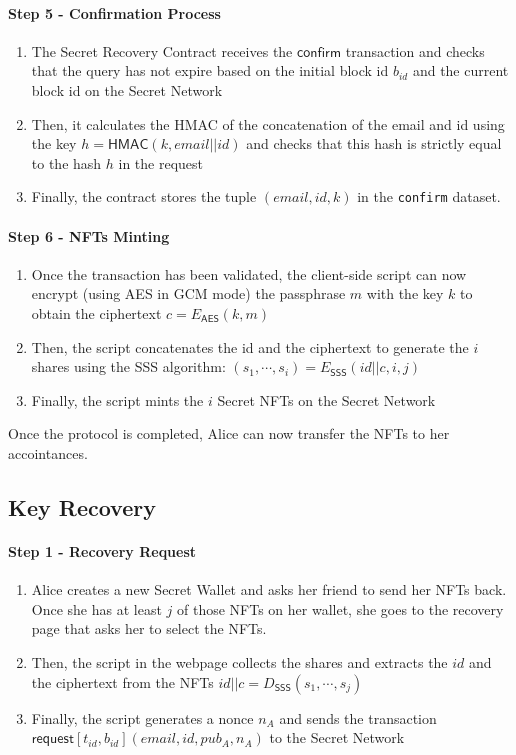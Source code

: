 \documentclass[12pt]{article}
\newcommand{\ms}[1]{\ensuremath{\mathsf{#1}}}
\newcommand{\tx}[3]{\ms{#1}[#2](#3)}
\begin{document}
\paragraph{Step 5 - Confirmation Process}

\begin{enumerate}[label=5.\arabic*]
  \item The Secret Recovery Contract receives the $\ms{confirm}$ transaction and checks that the query has not expire based on the initial block id $b_{id}$ and the current block id on the Secret Network
  \item Then, it calculates the HMAC of the concatenation of the email and id using the key $h=\ms{HMAC}(k, email || id)$ and checks that this hash is strictly equal to the hash $h$ in the request
  \item Finally, the contract stores the tuple $(email, id, k)$ in the {\tt confirm} dataset.
\end{enumerate}

\paragraph{Step 6 - NFTs Minting}

\begin{enumerate}[label=6.\arabic*]
  \item Once the transaction has been validated, the client-side script can now encrypt (using AES in GCM mode) the passphrase $m$ with the key $k$ to obtain the ciphertext $c=E_{\ms{AES}}(k, m)$
  \item Then, the script concatenates the id and the ciphertext to generate the $i$ shares using the SSS algorithm: $(s_1,\cdots,s_i)=E_{\ms{SSS}}(id||c, i, j)$
  \item Finally, the script mints the $i$ Secret NFTs on the Secret Network
\end{enumerate}

Once the protocol is completed, Alice can now transfer the NFTs to her accointances. 

\subsection{Key Recovery}

\paragraph{Step 1 - Recovery Request}

\begin{enumerate}[label=1.\arabic*]
    \item Alice creates a new Secret Wallet and asks her friend to send her NFTs back. Once she has at least $j$ of those NFTs on her wallet, she goes to the recovery page that asks her to select the NFTs.
    \item Then, the script in the webpage collects the shares and extracts the $id$ and the ciphertext from the NFTs $id||c = D_{\ms{SSS}}(s_1,\cdots,s_j)$
    \item Finally, the script generates a nonce $n_A$ and sends the transaction $\tx{request}{t_{id}, b_{id}}{email, id, pub_A, n_A}$ to the Secret Network
\end{enumerate}
\end{document}
